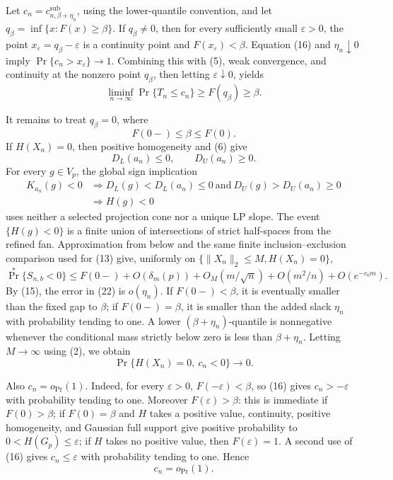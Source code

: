 Let \(c_n=c^{\mathrm{sub}}_{n,\beta+\eta_n}\), using the lower-quantile convention, and let \(q_\beta=\inf\{x:F(x)\geq\beta\}\).  If \(q_\beta\neq0\), then for every sufficiently small \(\varepsilon>0\), the point \(x_\varepsilon=q_\beta-\varepsilon\) is a continuity point and \(F(x_\varepsilon)<\beta\).  Equation (16) and \(\eta_n\downarrow0\) imply \(\Pr\{c_n>x_\varepsilon\}\to1\).  Combining this with (5), weak convergence, and continuity at the nonzero point \(q_\beta\), then letting \(\varepsilon\downarrow0\), yields
\[
\liminf_{n\to\infty}\Pr\{T_n\leq c_n\}\geq F(q_\beta)\geq\beta.
\tag{18}
\]

It remains to treat \(q_\beta=0\), where
\[
F(0-)\leq\beta\leq F(0).
\tag{19}
\]
If \(H(X_n)=0\), then positive homogeneity and (6) give
\[
D_L(a_n)\leq0,
\qquad D_U(a_n)\geq0.
\tag{20}
\]
For every \(g\in V_p\), the global sign implication
\[
\begin{aligned}
K_{a_n}(g)<0
&\Longrightarrow D_L(g)<D_L(a_n)\leq0
\ \text{and}\ D_U(g)>D_U(a_n)\geq0\\
&\Longrightarrow H(g)<0
\end{aligned}
\tag{21}
\]
uses neither a selected projection cone nor a unique LP slope.  The event \(\{H(g)<0\}\) is a finite union of intersections of strict half-spaces from the refined fan.  Approximation from below and the same finite inclusion--exclusion comparison used for (13) give, uniformly on \(\{\|X_n\|_2\leq M,H(X_n)=0\}\),
\[
\Pr^*\{S_{n,b}<0\}
\leq F(0-)+O(\delta_m(p))+O_M(m/\sqrt n)+O(m^2/n)+O(e^{-c_0m}).
\tag{22}
\]
By (15), the error in (22) is \(o(\eta_n)\).  If \(F(0-)<\beta\), it is eventually smaller than the fixed gap to \(\beta\); if \(F(0-)=\beta\), it is smaller than the added slack \(\eta_n\) with probability tending to one.  A lower \((\beta+\eta_n)\)-quantile is nonnegative whenever the conditional mass strictly below zero is less than \(\beta+\eta_n\).  Letting \(M\to\infty\) using (2), we obtain
\[
\Pr\{H(X_n)=0,\ c_n<0\}\longrightarrow0.
\tag{23}
\]

Also \(c_n=o_{\Pr}(1)\).  Indeed, for every \(\varepsilon>0\), \(F(-\varepsilon)<\beta\), so (16) gives \(c_n>-\varepsilon\) with probability tending to one.  Moreover \(F(\varepsilon)>\beta\): this is immediate if \(F(0)>\beta\); if \(F(0)=\beta\) and \(H\) takes a positive value, continuity, positive homogeneity, and Gaussian full support give positive probability to \(0<H(G_p)\leq\varepsilon\); if \(H\) takes no positive value, then \(F(\varepsilon)=1\).  A second use of (16) gives \(c_n\leq\varepsilon\) with probability tending to one.  Hence
\[
c_n=o_{\Pr}(1).
\tag{24}
\]

